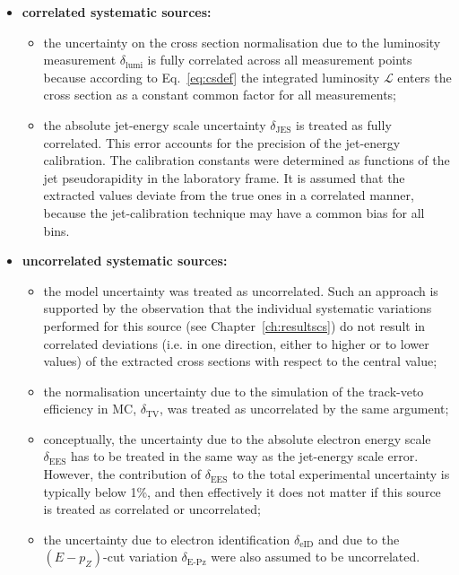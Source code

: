 \begin{itemize}
 \item \textbf{correlated systematic sources:}
 \begin{itemize}
 \item the uncertainty on the cross section normalisation due to the luminosity measurement $\delta_\text{lumi}$ is fully correlated across all measurement points because according to Eq.~\eqref{eq:csdef} the integrated luminosity $\mathcal{L}$ enters the cross section as a constant common factor for all measurements;
 \item the absolute jet-energy scale uncertainty $\delta_\text{JES}$ is treated as fully correlated. This error accounts for the precision of the jet-energy calibration. The calibration constants were determined as functions of the jet pseudorapidity in the laboratory frame. It is assumed that the extracted values deviate from the true ones in a correlated manner, because the jet-calibration technique may have a common bias for all bins.
 \end{itemize}
 \item \textbf{uncorrelated systematic sources:}
 \begin{itemize}
 \item the model uncertainty was treated as uncorrelated. Such an approach is supported by the observation that the individual systematic variations performed for this source (see Chapter~\ref{ch:resultscs}) do not result in correlated deviations (i.e. in one direction, either to higher or to lower values) of the extracted cross sections with respect to the central value;
 \item the normalisation uncertainty due to the simulation of the track-veto efficiency in MC, $\delta_\text{TV}$, was treated as uncorrelated by the same argument;
 \item conceptually, the uncertainty due to the absolute electron energy scale $\delta_\text{EES}$ has to be treated in the same way as the jet-energy scale error. However, the contribution of $\delta_\text{EES}$ to the total experimental uncertainty is typically below 1\%, and then effectively it does not matter if this source is treated as correlated or uncorrelated;
 \item the uncertainty due to electron identification $\delta_\text{eID}$ and due to the $\left(E-p_Z\right)$-cut variation $\delta_\text{E-Pz}$ were also assumed to be uncorrelated.
 \end{itemize}
\end{itemize}
